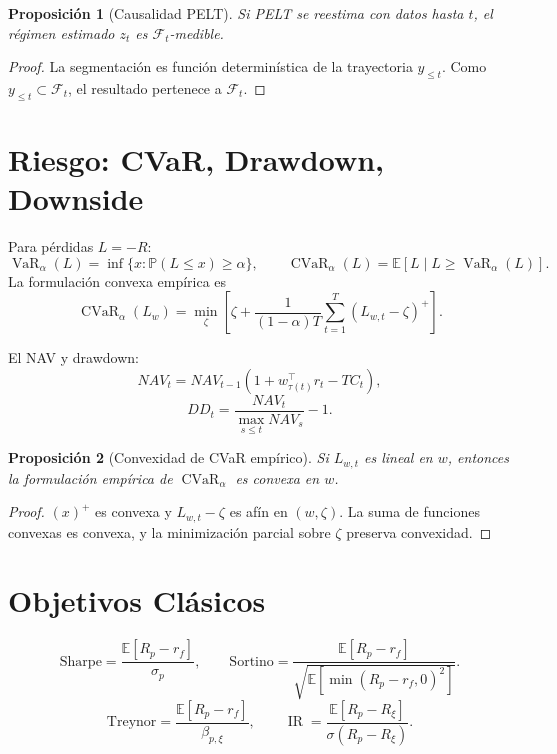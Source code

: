 \documentclass[11pt,letterpaper]{article}
\newtheorem{proposition}{Proposición}
\DeclareMathOperator{\CVaR}{CVaR}
\DeclareMathOperator{\VaR}{VaR}
\DeclareMathOperator{\IR}{IR}
\newcommand{\E}{\mathbb{E}}
\newcommand{\Prob}{\mathbb{P}}
\newcommand{\F}{\mathcal{F}}
\newcommand{\1}{\mathbbm{1}}
\begin{document}
\begin{proposition}[Causalidad PELT]
Si PELT se reestima con datos hasta \(t\), el régimen estimado \(z_t\) es \(\F_t\)-medible.
\end{proposition}

\begin{proof}
La segmentación es función determinística de la trayectoria \(y_{\le t}\). Como \(y_{\le t}\subset\F_t\), el resultado pertenece a \(\F_t\).
\end{proof}

\section{Riesgo: CVaR, Drawdown, Downside}

Para pérdidas \(L=-R\):
\[
  \VaR_\alpha(L)=\inf\{x:\Prob(L\le x)\ge\alpha\},
  \qquad
  \CVaR_\alpha(L)=\E[L\mid L\ge\VaR_\alpha(L)].
\]
La formulación convexa empírica es
\[
\CVaR_\alpha(L_w)
=
\min_{\zeta}
\left[
\zeta+
\frac{1}{(1-\alpha)T}
\sum_{t=1}^T
(L_{w,t}-\zeta)^+
\right].
\]

El NAV y drawdown:
\[
NAV_t=NAV_{t-1}(1+w_{\tau(t)}^\top r_t-TC_t),
\]
\[
DD_t=\frac{NAV_t}{\max_{s\le t}NAV_s}-1.
\]

\begin{proposition}[Convexidad de CVaR empírico]
Si \(L_{w,t}\) es lineal en \(w\), entonces la formulación empírica de \(\CVaR_\alpha\) es convexa en \(w\).
\end{proposition}
\begin{proof}
\((x)^+\) es convexa y \(L_{w,t}-\zeta\) es afín en \((w,\zeta)\). La suma de funciones convexas es convexa, y la minimización parcial sobre \(\zeta\) preserva convexidad.
\end{proof}

\section{Objetivos Clásicos}

\[
\mathrm{Sharpe}
=
\frac{\E[R_p-r_f]}{\sigma_p},
\qquad
\mathrm{Sortino}
=
\frac{\E[R_p-r_f]}
{\sqrt{\E[\min(R_p-r_f,0)^2]}}.
\]
\[
\mathrm{Treynor}
=
\frac{\E[R_p-r_f]}{\beta_{p,\xi}},
\qquad
\IR
=
\frac{\E[R_p-R_\xi]}
{\sigma(R_p-R_\xi)}.
\]
\end{document}
